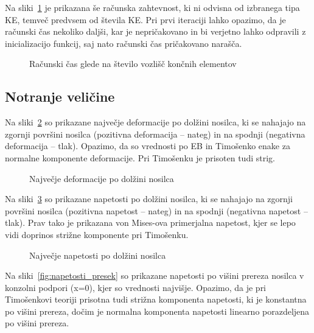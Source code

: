 \FloatBarrier
Na sliki~\ref{fig:cas} je prikazana še računska zahtevnost, ki ni odvisna od izbranega tipa KE, temveč predvsem od števila KE. Pri prvi iteraciji lahko opazimo, da je računski čas nekoliko daljši, kar je nepričakovano in bi verjetno lahko odpravili z inicializacijo funkcij, saj nato računski čas pričakovano narašča.
\begin{figure}[h]
    \centering
    \caption{Računski čas glede na število vozlišč končnih elementov}
    \label{fig:cas}
\end{figure} 

\FloatBarrier
\subsection{Notranje veličine}

Na sliki~\ref{fig:deformacije} so prikazane največje deformacije po dolžini nosilca, ki se nahajajo na zgornji površini nosilca (pozitivna deformacija -- nateg) in na spodnji (negativna deformacija -- tlak). Opazimo, da so vrednosti po EB in Timošenko enake za normalne komponente deformacije. Pri Timošenku je prisoten tudi strig.

\begin{figure}[ht]
    \centering
    \caption{Največje deformacije po dolžini nosilca}
    \label{fig:deformacije}
\end{figure}

Na sliki~\ref{fig:napetosti} so prikazane napetosti po dolžini nosilca, ki se nahajajo na zgornji površini nosilca (pozitivna napetost -- nateg) in na spodnji (negativna napetost -- tlak). Prav tako je prikazana von Mises-ova primerjalna napetost, kjer se lepo vidi doprinos strižne komponente pri Timošenku.

\begin{figure}[ht]
    \centering
    \caption{Največje napetosti po dolžini nosilca}
    \label{fig:napetosti}
\end{figure}

Na sliki~\ref{fig:napetosti_presek} so prikazane napetosti po višini prereza nosilca v konzolni podpori (x=0), kjer so vrednosti najvišje. Opazimo, da je pri Timošenkovi teoriji prisotna tudi strižna komponenta napetosti, ki je konstantna po višini prereza, dočim je normalna komponenta napetosti linearno porazdeljena po višini prereza.

